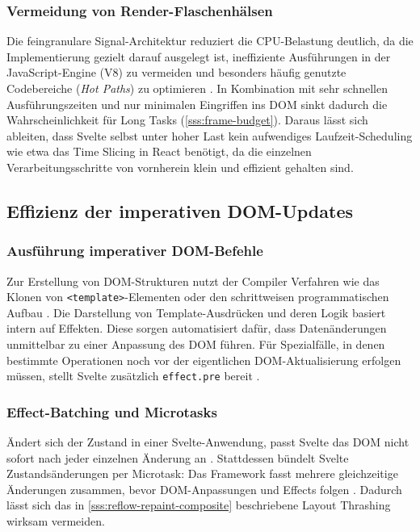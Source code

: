 \subsubsection{Vermeidung von Render-Flaschenhälsen}
\label{sss:rendering-bottleneck}

Die feingranulare Signal-Architektur reduziert die CPU-Belastung deutlich, da die Implementierung gezielt darauf ausgelegt ist, ineffiziente Ausführungen in der JavaScript-Engine (V8) zu vermeiden und besonders häufig genutzte Codebereiche (\textit{Hot Paths}) zu optimieren \cite{github-svelte_bench_13277-2024}. In Kombination mit sehr schnellen Ausführungszeiten und nur minimalen Eingriffen ins DOM sinkt dadurch die Wahrscheinlichkeit für Long Tasks (\cref{sss:frame-budget}). Daraus lässt sich ableiten, dass Svelte selbst unter hoher Last kein aufwendiges Laufzeit-Scheduling wie etwa das Time Slicing in React benötigt, da die einzelnen Verarbeitungsschritte von vornherein klein und effizient gehalten sind.


\subsection{Effizienz der imperativen DOM-Updates}
\label{ss:svelte-efficiency}

\subsubsection{Ausführung imperativer DOM-Befehle}
\label{sss:running-dom-commands}

Zur Erstellung von DOM-Strukturen nutzt der Compiler Verfahren wie das Klonen von \texttt{<template>}-Elementen oder den schrittweisen programmatischen Aufbau \cite{svelte-compiler}. Die Darstellung von Template-Ausdrücken und deren Logik basiert intern auf Effekten. Diese sorgen automatisiert dafür, dass Datenänderungen unmittelbar zu einer Anpassung des DOM führen. Für Spezialfälle, in denen bestimmte Operationen noch vor der eigentlichen DOM-Aktualisierung erfolgen müssen, stellt Svelte zusätzlich \texttt{effect.pre} bereit \cite{svelte-effect}.


\subsubsection{Effect-Batching und Microtasks}
\label{sss:microtasks}

Ändert sich der Zustand in einer Svelte-Anwendung, passt Svelte das DOM nicht sofort nach jeder einzelnen Änderung an \cite{medium-microtasks-2021}. Stattdessen bündelt Svelte Zustandsänderungen per Microtask: Das Framework fasst mehrere gleichzeitige Änderungen zusammen, bevor DOM-Anpassungen und Effects folgen \cite{svelte-effect}. Dadurch lässt sich das in \cref{sss:reflow-repaint-composite} beschriebene Layout Thrashing wirksam vermeiden. 


